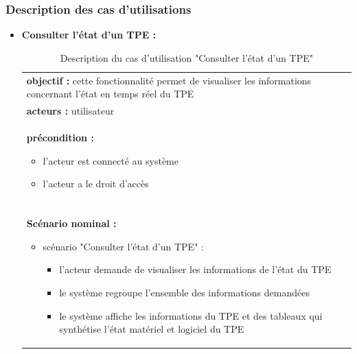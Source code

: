 \subsubsection*{Description des cas d’utilisations }
\begin{itemize}[label=\textbullet]
\newpage
\item \textbf{Consulter l'état d'un TPE :}
\begin{table}[!h]
\begin{tabular}{|p{15cm}|}%
\rowcolor{shadecolor}\multicolumn{1}{|c|}{Sommaire d’indentification} \\
\hline
\textbf{objectif : } cette fonctionnalité permet de visualiser les informations concernant l'état en temps réel du TPE \\
\textbf{acteurs : } utilisateur\\
\textbf{précondition : } 
	\begin{itemize}[label=\textbullet]
	\item l'acteur est connecté au système
	\item l'acteur a le droit d'accès
	\end{itemize}
	\\
\hline
\rowcolor{shadecolor}\multicolumn{1}{|c|}{Description des scénarios} \\
\hline
	\textbf{Scénario nominal :}
	\begin{itemize}[label=\textbullet]
	\item scénario "Consulter l'état d'un TPE" :
		\begin{itemize}
		\item l'acteur demande de visualiser les informations de l'état du TPE
		\item le système regroupe l'ensemble des informations demandées 
		
		\item le système affiche les informations du TPE et des tableaux qui synthétise l'état matériel et logiciel du TPE
		\end{itemize}
	\end{itemize}
	\\
\hline
\end{tabular}
\centering \caption{Description du cas d’utilisation "Consulter l'état d'un TPE"} \label{TablePR}
\end{table}




\end{itemize}
